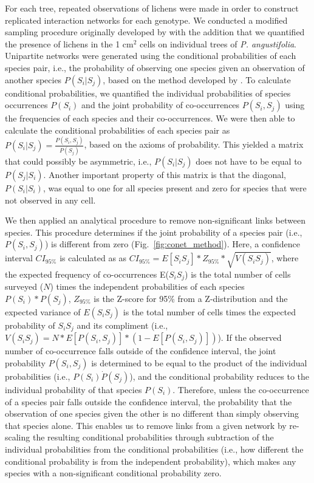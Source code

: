 \documentclass[fleqn,12pt]{olplainarticle}
\begin{document}
For each tree, repeated observations of lichens were made in order to
construct replicated interaction networks for each genotype. We
conducted a modified sampling procedure originally developed by
\cite{Lamit2015a} with the addition that we quantified the presence of
lichens in the 1 cm$^2$ cells on individual trees of
\textit{P. angustifolia}. Unipartite networks were generated using the
conditional probabilities of each species pair, i.e., the probability
of observing one species given an observation of another species
$P(S_i | S_j)$, based on the method developed by \cite{Araujo2011}. To
calculate conditional probabilities, we quantified the individual
probabilities of species occurrences $P(S_i)$ and the joint
probability of co-occurrences $P(S_i, S_j)$ using the frequencies of
each species and their co-occurrences. We were then able to calculate
the conditional probabilities of each species pair as $P(S_i|S_j) =
\frac{P(S_i,S_j)}{P(S_j)}$, based on the axioms of probability. This
yielded a matrix that could possibly be asymmetric, i.e., $P(S_i|S_j)$
does not have to be equal to $P(S_j|S_i)$. Another important property
of this matrix is that the diagonal, $P(S_{i} | S_{i})$, was equal to
one for all species present and zero for species that were not
observed in any cell.

We then applied an analytical procedure to remove non-significant
links between species. This procedure determines if the joint
probability of a species pair (i.e., $P(S_i,S_j)$) is different from
zero (Fig.~\ref{fig:conet_method}).  Here, a confidence interval
$CI_{95\%}$ is calculated as as $CI_{95\%} = E[S_iS_j] * Z_{95\%} *
\sqrt{V(S_iS_j)}$, where the expected frequency of co-occurrences
E($S_iS_j$) is the total number of cells surveyed ($N$) times the
independent probabilities of each species $P(S_i) * P(S_j)$,
$Z_{95\%}$ is the Z-score for 95\% from a Z-distribution and the
expected variance of $E(S_iS_j)$ is the total number of cells times
the expected probability of $S_iS_j$ and its compliment (i.e.,
$V(S_iS_j) = N * E[P(S_i,S_j)] * (1 - E[P(S_i,S_j)])$). If the
observed number of co-occurrence falls outside of the confidence
interval, the joint probability $P(S_i,S_j)$ is determined to be equal
to the product of the individual probabilities (i.e., $P(S_i) \dot
P(S_j)$), and the conditional probability reduces to the individual
probability of that species $P(S_i)$. Therefore, unless the
co-occurrence of a species pair falls outside the confidence interval,
the probability that the observation of one species given the other is
no different than simply observing that species alone. This enables us
to remove links from a given network by re-scaling the resulting
conditional probabilities through subtraction of the individual
probabilities from the conditional probabilities (i.e., how different
the conditional probability is from the independent probability),
which makes any species with a non-significant conditional probability
zero.
\end{document}
